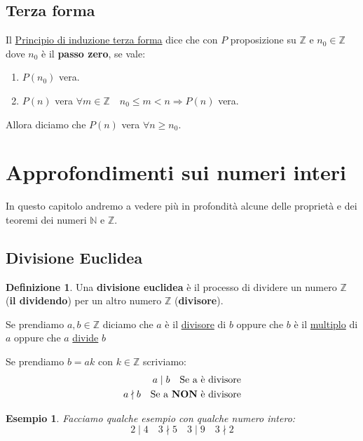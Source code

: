 \documentclass{article}
\newtheorem{exmp}{Esempio}[section]
\theoremstyle{definition}
\newtheorem{definition}{Definizione}[section]
\begin{document}
\subsection{Terza forma}\label{sec:induzione_terza_forma}
Il \underline{Principio di induzione terza forma} dice che con $P$ proposizione su $\mathbb{Z}$ e $n_0 \in \mathbb{Z}$ dove $n_0$ è il \textbf{passo zero}, se vale:
\begin{enumerate}
        \item $P(n_0)$ vera. 
        \item $P(n)$ vera $\forall m \in \mathbb{Z} \quad n_0 \le m < n \Rightarrow P(n)$ vera. 
\end{enumerate}
Allora diciamo che $P(n)$ vera $\forall n \ge n_0$.






\newpage
\section{Approfondimenti sui numeri interi}\label{sec:numeri_interi}
In questo capitolo andremo a vedere più in profondità alcune delle proprietà e dei teoremi dei numeri $ \mathbb{N} $ e $ \mathbb{Z} $.   


\subsection{Divisione Euclidea}\label{sec:divisione_euclidea}
\begin{definition}
       Una \textbf{divisione euclidea} è il processo di dividere un numero $ \mathbb{Z} $ (\textbf{il dividendo}) per un altro numero $ \mathbb{Z} $ (\textbf{divisore}). \par
       Se prendiamo $ a,b \in \mathbb{Z} $ diciamo che $ a $ è il \underline{divisore} di $ b $ oppure che $ b $ è il \underline{multiplo} di $ a $ oppure che $ a $ \underline{divide} $ b $        
\end{definition}

Se prendiamo $ b = ak $ con $ k \in \mathbb{Z} $ scriviamo:
\begin{align*}
        a \mid b \quad \mbox{Se a è divisore} \\
        a \nmid b \quad \mbox{Se a \textbf{NON} è divisore}
\end{align*}

\begin{exmp}
        Facciamo qualche esempio con qualche numero intero:
        \begin{equation*}
                2 \mid 4 \quad 3 \nmid 5 \quad 3 \mid 9 \quad 3 \nmid 2
        \end{equation*} 
\end{exmp}
\end{document}
